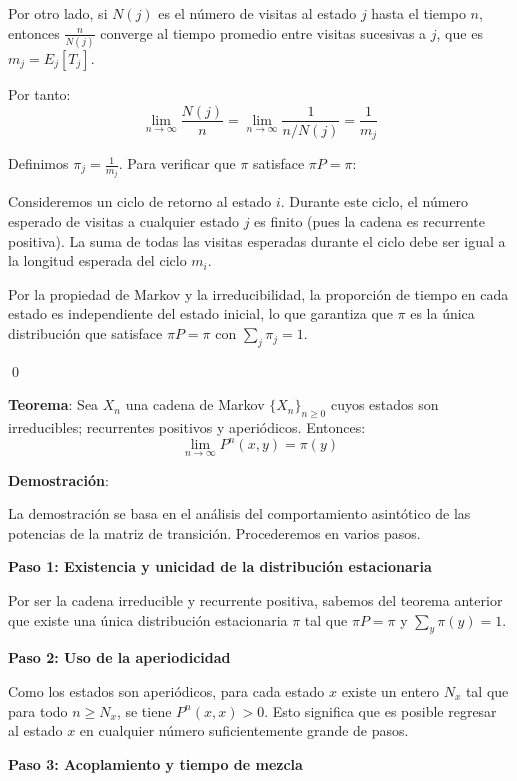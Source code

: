 \documentclass[12pt,a4paper]{article}
\newcommand{\teorema}[1]{%
\begin{teoremabox}
\textbf{Teorema}: #1
\end{teoremabox}
}
\begin{document}
Por otro lado, si $N(j)$ es el número de visitas al estado $j$ hasta el tiempo $n$, entonces $\frac{n}{N(j)}$ converge al tiempo promedio entre visitas sucesivas a $j$, que es $m_j = E_j[T_j]$.

Por tanto:
\begin{equation*}
\lim_{n \to \infty} \frac{N(j)}{n} = \lim_{n \to \infty} \frac{1}{n/N(j)} = \frac{1}{m_j}
\end{equation*}

Definimos $\pi_j = \frac{1}{m_j}$. Para verificar que $\pi$ satisface $\pi P = \pi$:

Consideremos un ciclo de retorno al estado $i$. Durante este ciclo, el número esperado de visitas a cualquier estado $j$ es finito (pues la cadena es recurrente positiva). La suma de todas las visitas esperadas durante el ciclo debe ser igual a la longitud esperada del ciclo $m_i$.

Por la propiedad de Markov y la irreducibilidad, la proporción de tiempo en cada estado es independiente del estado inicial, lo que garantiza que $\pi$ es la única distribución que satisface $\pi P = \pi$ con $\sum_{j} \pi_j = 1$.

\qed

\teorema{Sea $X_n$ una cadena de Markov $\{X_n\}_{n \geq 0}$ cuyos estados son irreducibles; recurrentes positivos y aperiódicos. Entonces:
\begin{equation*}
\lim_{n \to \infty} P^n(x,y) = \pi(y)
\end{equation*}}

\textbf{Demostración}:

La demostración se basa en el análisis del comportamiento asintótico de las potencias de la matriz de transición. Procederemos en varios pasos.

\textbf{Paso 1: Existencia y unicidad de la distribución estacionaria}

Por ser la cadena irreducible y recurrente positiva, sabemos del teorema anterior que existe una única distribución estacionaria $\pi$ tal que $\pi P = \pi$ y $\sum_{y} \pi(y) = 1$.

\textbf{Paso 2: Uso de la aperiodicidad}

Como los estados son aperiódicos, para cada estado $x$ existe un entero $N_x$ tal que para todo $n \geq N_x$, se tiene $P^n(x,x) > 0$. Esto significa que es posible regresar al estado $x$ en cualquier número suficientemente grande de pasos.

\textbf{Paso 3: Acoplamiento y tiempo de mezcla}
\end{document}
